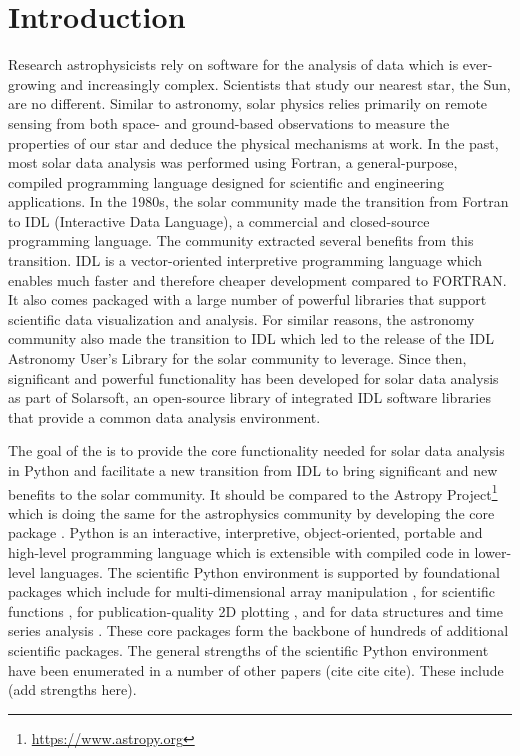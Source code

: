 \section{Introduction}
\label{sec:intro}

Research astrophysicists rely on software for the analysis of data which is ever-growing and increasingly complex.
Scientists that study our nearest star, the Sun, are no different.
Similar to astronomy, solar physics relies primarily on remote sensing from both space- and ground-based observations to measure the properties of our star and deduce the physical mechanisms at work.
In the past, most solar data analysis was performed using Fortran, a general-purpose, compiled programming language designed for scientific and engineering applications.
In the 1980s, the solar community made the transition from Fortran to IDL (Interactive Data Language), a commercial and closed-source programming language.
The community extracted several benefits from this transition.
IDL is a vector-oriented interpretive programming language which enables much faster and therefore cheaper development compared to FORTRAN.
It also comes packaged with a large number of powerful libraries that support scientific data visualization and analysis.
For similar reasons, the astronomy community also made the transition to IDL which led to the release of the IDL Astronomy User's Library for the solar community to leverage.
Since then, significant and powerful functionality has been developed for solar data analysis as part of Solarsoft, an open-source library of integrated IDL software libraries that provide a common data analysis environment\citet{freeland1998}.

The goal of the \sunpyproj is to provide the core functionality needed for solar data analysis in Python and facilitate a new transition from IDL to bring significant and new benefits to the solar community.
It should be compared to the Astropy Project\footnote{\url{https://www.astropy.org}} which is doing the same for the astrophysics community by developing the \astropypkg core package \citep{astropy2018}.
Python is an interactive, interpretive, object-oriented, portable and high-level programming language which is extensible with compiled code in lower-level languages.
The scientific Python environment is supported by foundational packages which include \numpy for multi-dimensional array manipulation \citep{numpy}, \scipy for scientific functions \citep{scipy}, \matplotlib for publication-quality 2D plotting \citep{matplotlib}, and \pandas for data structures and time series analysis \citep{pandas}.
These core packages form the backbone of hundreds of additional scientific \python packages.
The general strengths of the scientific Python environment have been enumerated in a number of other papers (cite cite cite). These include (add strengths here).

